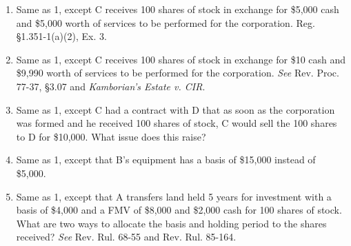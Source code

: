 \documentclass[12pt]{article}
\begin{document}
\begin{enumerate}
						
	\item Same as 1, except C receives 100 shares of stock in exchange for \$5,000 cash and \$5,000 worth of services to be performed for the corporation. Reg. \S1.351-1(a)(2), Ex. 3.


	\item
	Same as 1, except C receives 100 shares of stock in exchange for \$10 cash and \$9,990 worth of services to be performed for the corporation.   \textit{See} Rev. Proc. 77-37, \S3.07 and \emph{Kamborian's Estate v. CIR}.
	
	
	\item
	Same as 1, except C had a contract with D that as soon as the corporation was formed and he received 100 shares of stock, C would sell the 100 shares to D for \$10,000.  What issue does this raise?
	\item Same as 1, except that B's equipment has a basis of \$15,000 instead of \$5,000. 
	
	\item 
		Same as 1, except that A transfers land held 5 years for investment with a basis of \$4,000 and a FMV of \$8,000 and \$2,000 cash for 100 shares of stock.   What are two ways to allocate the basis and holding period to the shares received?  \emph{See} Rev. Rul. 68-55 and Rev. Rul. 85-164.


	\end{enumerate}



%
\end{document}
